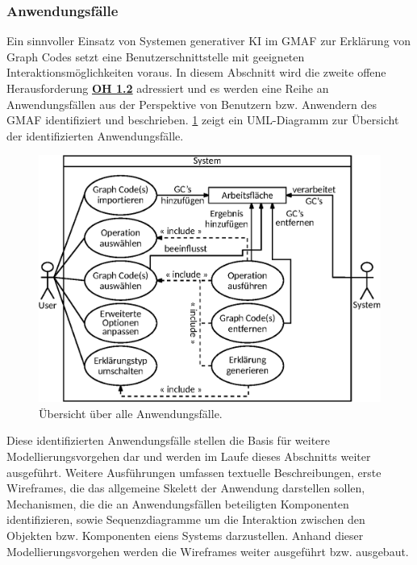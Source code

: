 \subsubsection{Anwendungsfälle}
\label{sec3:model:subsubsec:use-cases}
Ein sinnvoller Einsatz von Systemen generativer KI im GMAF zur Erklärung von Graph Codes setzt eine Benutzerschnittstelle mit geeigneten Interaktionsmöglichkeiten voraus.
In diesem Abschnitt wird die zweite offene Herausforderung \hyperref[sec2:sota:oi:1.2]{\textbf{OH 1.2}} adressiert und es werden eine Reihe an Anwendungsfällen aus der Perspektive von Benutzern bzw. Anwendern des GMAF identifiziert und beschrieben.
\cref{sec3:model:subsubsec:use-cases:fig:overview-use-cases} zeigt ein UML-Diagramm zur Übersicht der identifizierten Anwendungsfälle.
\begin{figure}[htb]
    \centering
    \includegraphics[width=\textwidth]{chapter/chapter_3/uml-explainer-system.eps}
    \caption{Übersicht über alle Anwendungsfälle.}
    \label{sec3:model:subsubsec:use-cases:fig:overview-use-cases}
\end{figure}
\noindent
Diese identifizierten Anwendungsfälle stellen die Basis für weitere Modellierungsvorgehen dar und werden im Laufe dieses Abschnitts weiter ausgeführt.
Weitere Ausführungen umfassen textuelle Beschreibungen, erste Wireframes, die das allgemeine Skelett der Anwendung darstellen sollen, Mechanismen, die die an Anwendungsfällen beteiligten Komponenten identifizieren, sowie Sequenzdiagramme um die Interaktion zwischen den Objekten bzw. Komponenten eiens Systems darzustellen.
Anhand dieser Modellierungsvorgehen werden die Wireframes weiter ausgeführt bzw. ausgebaut.

